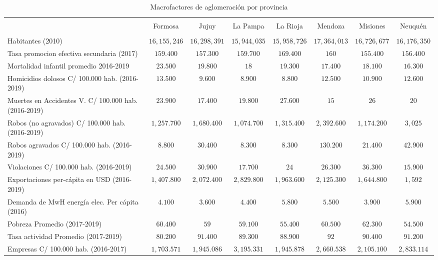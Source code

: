 \documentclass[12pt,a4paper]{article}
\begin{document}
\begin{table} \centering \tiny
 \centering 
  \caption{Macrofactores de aglomeración por provincia} 

\begin{tabular}{@{\extracolsep{5pt}} lccccccc} 
\\[-1.8ex]\hline 
\hline \\[-1.8ex] 
 & Formosa & Jujuy & La Pampa & La Rioja & Mendoza & Misiones & Neuquén \\ 
\hline \\[-1.8ex] 
Habitantes (2010) & $16,155,246$ & $16,298,391$ & $15,944,035$ & $15,958,726$ & $17,364,013$ & $16,726,677$ & $16,176,350$ \\ 
Tasa promocion efectiva secundaria (2017) & $159.400$ & $157.300$ & $159.700$ & $169.400$ & $160$ & $155.400$ & $156.400$ \\ 
Mortalidad infantil promedio 2016-2019 & $23.500$ & $19.800$ & $18$ & $19.300$ & $17.400$ & $18.100$ & $16.300$ \\ 
Homicidios dolosos C/ 100.000 hab. (2016-2019) & $13.500$ & $9.600$ & $8.900$ & $8.800$ & $12.500$ & $10.900$ & $12.600$ \\ 
Muertes en Accidentes V. C/ 100.000  hab.  (2016-2019) & $23.900$ & $17.400$ & $19.800$ & $27.600$ & $15$ & $26$ & $20$ \\ 
Robos (no agravados) C/ 100.000 hab. (2016-2019) & $1,257.700$ & $1,680.400$ & $1,074.700$ & $1,315.400$ & $2,392.600$ & $1,174.200$ & $3,025$ \\ 
Robos agravados C/ 100.000 hab. (2016-2019) & $8.800$ & $30.400$ & $8.300$ & $8.300$ & $130.200$ & $21.400$ & $42.900$ \\ 
Violaciones  C/ 100.000 hab. (2016-2019) & $24.500$ & $30.900$ & $17.700$ & $24$ & $26.300$ & $36.300$ & $15.900$ \\ 
Exportaciones per-cápita en USD (2016-2019) & $1,407.800$ & $2,072.400$ & $2,829.800$ & $1,963.600$ & $2,125.300$ & $1,644.800$ & $1,592$ \\ 
Demanda de MwH energía elec. Per cápita (2016) & $4.100$ & $3.600$ & $4.400$ & $5.800$ & $5.500$ & $3.900$ & $5.900$ \\ 
Pobreza Promedio (2017-2019) & $60.400$ & $59$ & $59.100$ & $55.400$ & $60.500$ & $62.300$ & $54.500$ \\ 
Tasa actividad Promedio (2017-2019) & $80.200$ & $91.400$ & $89.300$ & $88.900$ & $92$ & $90.400$ & $91.200$ \\ 
Empresas  C/ 100.000 hab. (2016-2017) & $1,703.571$ & $1,945.086$ & $3,195.331$ & $1,945.878$ & $2,660.538$ & $2,105.100$ & $2,833.114$ \\ 

\end{tabular}
\end{table}
\end{document}
